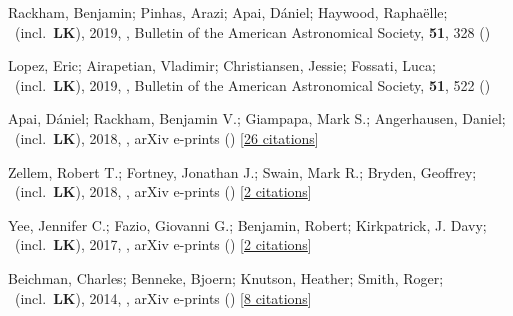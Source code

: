 \item[{\color{numcolor}\scriptsize6}] Rackham, Benjamin; Pinhas, Arazi; Apai, D{\'a}niel; Haywood, Rapha{\"e}lle; \etal\ (incl.\ \textbf{LK}), 2019, , Bulletin of the American Astronomical Society, \textbf{51}, 328 ()

\item[{\color{numcolor}\scriptsize5}] Lopez, Eric; Airapetian, Vladimir; Christiansen, Jessie; Fossati, Luca; \etal\ (incl.\ \textbf{LK}), 2019, , Bulletin of the American Astronomical Society, \textbf{51}, 522 ()

\item[{\color{numcolor}\scriptsize4}] Apai, D{\'a}niel; Rackham, Benjamin V.; Giampapa, Mark S.; Angerhausen, Daniel; \etal\ (incl.\ \textbf{LK}), 2018, , arXiv e-prints () [\href{https://ui.adsabs.harvard.edu/abs/2018arXiv180308708A}{26 citations}]

\item[{\color{numcolor}\scriptsize3}] Zellem, Robert T.; Fortney, Jonathan J.; Swain, Mark R.; Bryden, Geoffrey; \etal\ (incl.\ \textbf{LK}), 2018, , arXiv e-prints () [\href{https://ui.adsabs.harvard.edu/abs/2018arXiv180307163Z}{2 citations}]

\item[{\color{numcolor}\scriptsize2}] Yee, Jennifer C.; Fazio, Giovanni G.; Benjamin, Robert; Kirkpatrick, J. Davy; \etal\ (incl.\ \textbf{LK}), 2017, , arXiv e-prints () [\href{https://ui.adsabs.harvard.edu/abs/2017arXiv171004194Y}{2 citations}]

\item[{\color{numcolor}\scriptsize1}] Beichman, Charles; Benneke, Bjoern; Knutson, Heather; Smith, Roger; \etal\ (incl.\ \textbf{LK}), 2014, , arXiv e-prints () [\href{https://ui.adsabs.harvard.edu/abs/2014arXiv1411.1754B}{8 citations}]